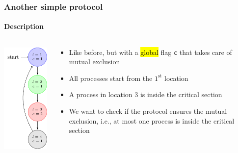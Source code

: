 \begin{frame}
  \frametitle{Another simple protocol}
  \framesubtitle{Description}

\begin{columns}
\begin{column}{0.3\textwidth}
\centering
\includegraphics{pictures/demo-prot2-fig}
\end{column}


\begin{column}{0.7\textwidth}
  \begin{itemize}
    \item Like before, but with a \hl{global} flag {\tt c} that
          takes care of mutual exclusion

    \item All processes start from the $1^{\text{st}}$ location

    \item A process in location $3$ is inside the critical section

    \item We want to check if the protocol ensures the mutual exclusion,
	  i.e., at most one process is inside the critical section
  \end{itemize}
\end{column}

\end{columns}  

\end{frame}




